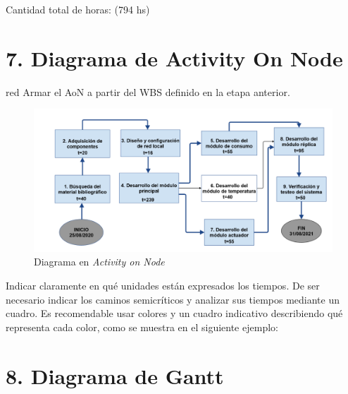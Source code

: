 \documentclass[11pt]{charter}
\begin{document}
Cantidad total de horas: (794 hs)

\section{7. Diagrama de Activity On Node}
\label{sec:AoN}

\begin{consigna}{red}
Armar el AoN a partir del WBS definido en la etapa anterior. 



\end{consigna}

\begin{figure}[htpb]
\centering 
\includegraphics[width=.8\textwidth]{./Figuras/AoN.png}
\caption{Diagrama en \textit{Activity on Node}}
\label{fig:AoN}
\end{figure}

Indicar claramente en qué unidades están expresados los tiempos.
De ser necesario indicar los caminos semicríticos y analizar sus tiempos mediante un cuadro.
Es recomendable usar colores y un cuadro indicativo describiendo qué representa cada color, como se muestra en el siguiente ejemplo:



\section{8. Diagrama de Gantt}
\label{sec:gantt}
\end{document}
